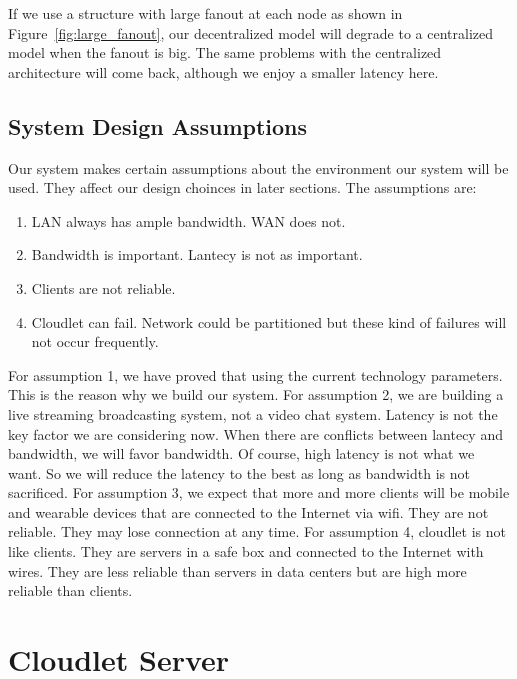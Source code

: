 \documentclass[letterpaper,twocolumn,10pt]{article}
\begin{document}
If we use a structure with large fanout at each node as shown in Figure~\ref{fig:large_fanout}, our decentralized model will degrade to a centralized model when the fanout is big. The same problems with the centralized architecture will come back, although we enjoy a smaller latency here.



\subsection{System Design Assumptions}

Our system makes certain assumptions about the environment our system will be used. They affect our design choinces in later sections. The assumptions are:

\begin{enumerate}
  \item LAN always has ample bandwidth. WAN does not.
  \item Bandwidth is important. Lantecy is not as important.
  \item Clients are not reliable.
  \item Cloudlet can fail. Network could be partitioned but these kind of failures will not occur frequently.
\end{enumerate}

For assumption 1, we have proved that using the current technology parameters. This is the reason why we build our system. For assumption 2, we are building a live streaming broadcasting system, not a video chat system. Latency is not the key factor we are considering now. When there are conflicts between lantecy and bandwidth, we will favor bandwidth. Of course, high latency is not what we want. So we will reduce the latency to the best as long as bandwidth is not sacrificed. For assumption 3, we expect that more and more clients will be mobile and wearable devices that are connected to the Internet via wifi. They are not reliable. They may lose connection at any time. For assumption 4, cloudlet is not like clients. They are servers in a safe box and connected to the Internet with wires. They are less reliable than servers in data centers but are high more reliable than clients.

\section{Cloudlet Server}
\end{document}
